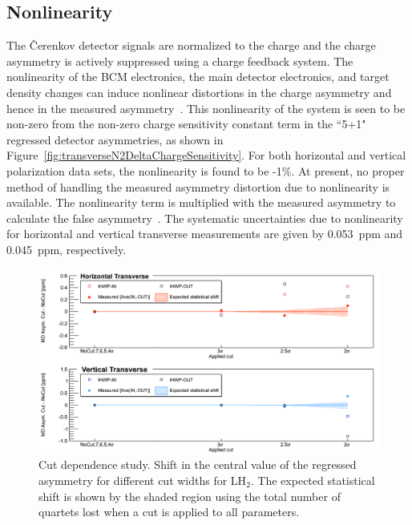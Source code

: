 \subsection{Nonlinearity}
\label{Nonlinearity}
The \v{C}erenkov detector signals are normalized to the charge and the charge asymmetry is actively suppressed using a charge feedback system. The nonlinearity of the BCM electronics, the main detector electronics, and target density changes can induce nonlinear distortions in the charge asymmetry and hence in the measured asymmetry~\cite{mack_BCMLinearity}. This nonlinearity of the system is seen to be non-zero from the non-zero charge sensitivity constant term in the ``5+1" regressed detector asymmetries, as shown in Figure~\ref{fig:transverseN2DeltaChargeSensitivity}. For both horizontal and vertical polarization data sets, the nonlinearity is found to be -1\%. At present, no proper method of handling the measured asymmetry distortion due to nonlinearity is available. The nonlinearity term is multiplied with the measured asymmetry to calculate the false asymmetry~\cite{mack_nonlinearity}. The systematic uncertainties due to nonlinearity for horizontal and vertical transverse measurements are given by 0.053~ppm and 0.045~ppm, respectively.


\begin{figure}[!h]
	\begin{center}
	\includegraphics[width=15.0cm]{figures/cutDependence_LH2}
	\end{center}
	\caption
	{Cut dependence study. Shift in the central value of the regressed asymmetry for different cut widths for LH$_{2}$. The expected statistical shift is shown by the shaded region using the total number of quartets lost when a cut is applied to all parameters.}
	\label{fig:cutDependence_LH2}
\end{figure}

